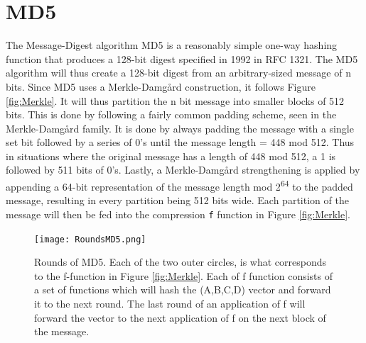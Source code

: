 \documentclass[a4paper, openany]{book}
\begin{document}
\section{MD5}
\label{MD5alg}
The Message-Digest algorithm MD5 is a reasonably simple one-way hashing function that produces a 128-bit digest specified in 1992 in RFC 1321\cite{rfc1321}.
The MD5 algorithm will thus create a 128-bit digest from an arbitrary-sized message of n bits. Since MD5 uses a Merkle-Damgård construction, it follows Figure \ref{fig:Merkle}. It will thus partition the n bit message into smaller blocks of 512 bits. This is done by following a fairly common padding scheme, seen in the Merkle-Damgård family. It is done by always padding the message with a single set bit followed by a series of 0's until the message length = 448 mod 512. Thus in situations where the original message has a length of 448 mod 512, a 1 is followed by 511 bits of 0's. Lastly, a Merkle-Damgård strengthening is applied by appending a 64-bit representation of the message length mod 2\textsuperscript{64} to the padded message, resulting in every partition being 512 bits wide.
Each partition of the message will then be fed into the compression \texttt{f} function in Figure \ref{fig:Merkle}.


\begin{figure}[!htb]
\centering
\captionsetup{width=.8\linewidth}
\texttt{[image: RoundsMD5.png]}
\caption[MD5 Rounds]%
{Rounds of MD5. Each of the two outer circles, is what corresponds to the f-function in Figure \ref{fig:Merkle}. Each of f function consists of a set of functions which will hash the (A,B,C,D) vector and forward it to the next round. The last round of an application of f will forward the vector to the next application of f on the next block of the message.}
\label{fig:MD5}
\end{figure}
\end{document}
